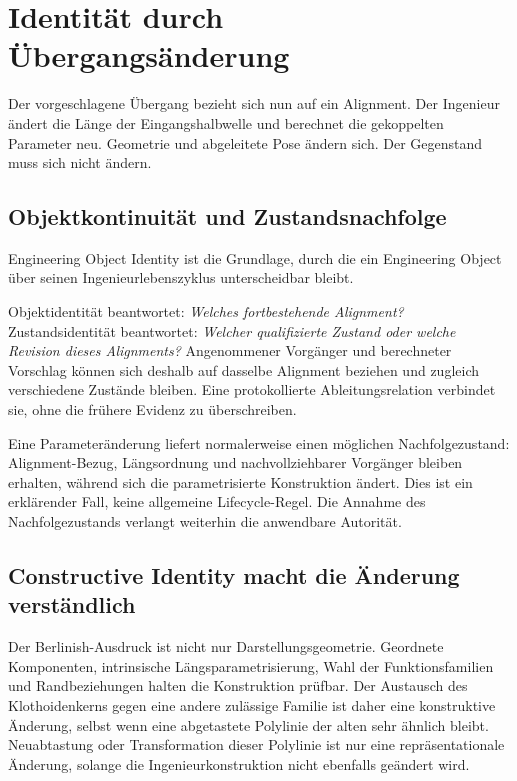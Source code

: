 
\chapter{Identität durch Übergangsänderung}
\label{chap:engineering-identity}

Der vorgeschlagene Übergang bezieht sich nun auf ein Alignment. Der Ingenieur
ändert die Länge der Eingangshalbwelle und berechnet die gekoppelten Parameter
neu. Geometrie und abgeleitete Pose ändern sich. Der Gegenstand muss sich nicht
ändern.

\section{Objektkontinuität und Zustandsnachfolge}

\begin{definition}
\label{def:engineering-object-identity}
Engineering Object Identity ist die Grundlage, durch die ein Engineering
Object über seinen Ingenieurlebenszyklus unterscheidbar bleibt.
\end{definition}

Objektidentität beantwortet: \emph{Welches fortbestehende Alignment?}
Zustandsidentität beantwortet: \emph{Welcher qualifizierte Zustand oder welche
Revision dieses Alignments?} Angenommener Vorgänger und berechneter Vorschlag
können sich deshalb auf dasselbe Alignment beziehen und zugleich verschiedene
Zustände bleiben. Eine protokollierte Ableitungsrelation verbindet sie, ohne
die frühere Evidenz zu überschreiben.

Eine Parameteränderung liefert normalerweise einen möglichen Nachfolgezustand:
Alignment-Bezug, Längsordnung und nachvollziehbarer Vorgänger bleiben erhalten,
während sich die parametrisierte Konstruktion ändert. Dies ist ein erklärender
Fall, keine allgemeine Lifecycle-Regel. Die Annahme des Nachfolgezustands
verlangt weiterhin die anwendbare Autorität.

\section{Constructive Identity macht die Änderung verständlich}

Der Berlinish-Ausdruck ist nicht nur Darstellungsgeometrie. Geordnete
Komponenten, intrinsische Längsparametrisierung, Wahl der Funktionsfamilien und
Randbeziehungen halten die Konstruktion prüfbar. Der Austausch des
Klothoidenkerns gegen eine andere zulässige Familie ist daher eine konstruktive
Änderung, selbst wenn eine abgetastete Polylinie der alten sehr ähnlich bleibt.
Neuabtastung oder Transformation dieser Polylinie ist nur eine
repräsentationale Änderung, solange die Ingenieurkonstruktion nicht ebenfalls
geändert wird.

